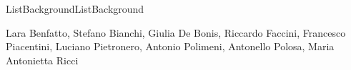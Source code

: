 \begin{fsmbox}{6cm}{ListBackground}{ListBackground}
\begin{minipage}{4.7cm}
Lara Benfatto,
Stefano Bianchi,
Giulia De Bonis,
Riccardo Faccini,
Francesco Piacentini,
Luciano Pietronero,
Antonio Polimeni,
Antonello Polosa,
Maria Antonietta Ricci
\end{minipage}
\end{fsmbox}
